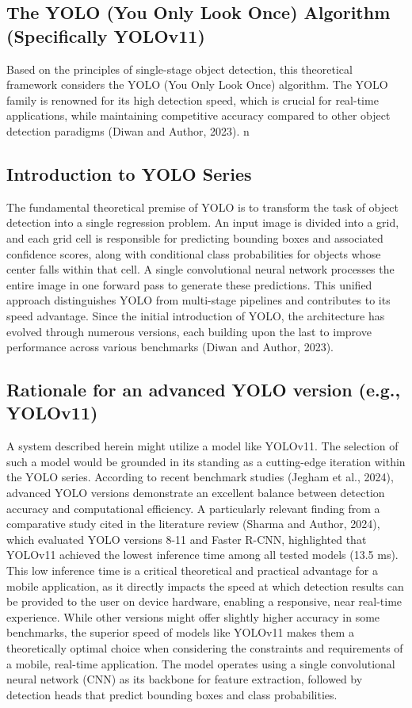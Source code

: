  \subsection{The YOLO (You Only Look Once) Algorithm (Specifically YOLOv11)}
Based on the principles of single-stage object detection, this theoretical framework considers the YOLO (You
Only Look Once) algorithm. The YOLO family is renowned for its high detection speed, which is crucial for
real-time applications, while maintaining competitive accuracy compared to other object detection paradigms
(Diwan and Author, 2023).
n
\subsection{Introduction to YOLO Series}
The fundamental theoretical premise of YOLO is to transform the task of object detection into a single
regression problem. An input image is divided into a grid, and each grid cell is responsible for predicting
bounding boxes and associated confidence scores, along with conditional class probabilities for objects whose
center falls within that cell. A single convolutional neural network processes the entire image in one forward
pass to generate these predictions. This unified approach distinguishes YOLO from multi-stage pipelines
and contributes to its speed advantage. Since the initial introduction of YOLO, the architecture has evolved
through numerous versions, each building upon the last to improve performance across various benchmarks
(Diwan and Author, 2023).

\subsection{ Rationale for an advanced YOLO version (e.g., YOLOv11)}
A system described herein might utilize a model like YOLOv11. The selection of such a model would be
grounded in its standing as a cutting-edge iteration within the YOLO series. According to recent benchmark
studies (Jegham et al., 2024), advanced YOLO versions demonstrate an excellent balance between detection
accuracy and computational efficiency. A particularly relevant finding from a comparative study cited in
the literature review (Sharma and Author, 2024), which evaluated YOLO versions 8-11 and Faster R-CNN,
highlighted that YOLOv11 achieved the lowest inference time among all tested models (13.5 ms). This
low inference time is a critical theoretical and practical advantage for a mobile application, as it directly
impacts the speed at which detection results can be provided to the user on device hardware, enabling a
responsive, near real-time experience. While other versions might offer slightly higher accuracy in some
benchmarks, the superior speed of models like YOLOv11 makes them a theoretically optimal choice when
considering the constraints and requirements of a mobile, real-time application. The model operates using
a single convolutional neural network (CNN) as its backbone for feature extraction, followed by detection
heads that predict bounding boxes and class probabilities.

